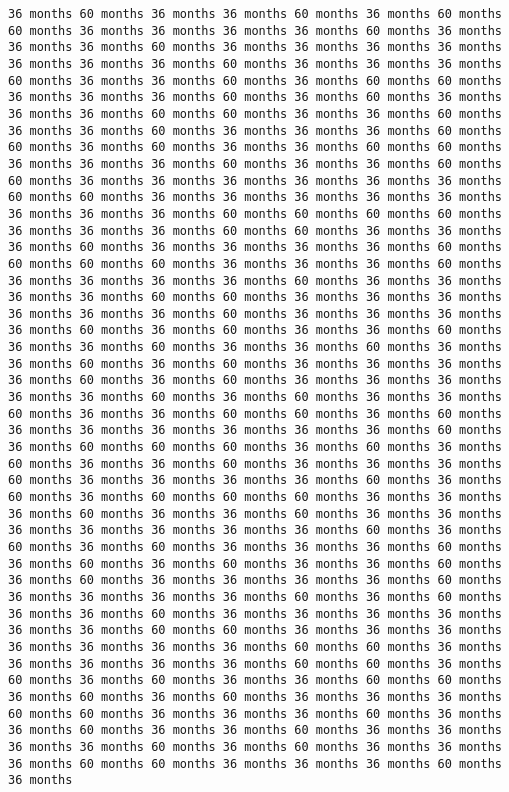 \documentclass[11pt]{article}
\begin{document}
\begin{Verbatim}[commandchars=\\\{\}, frame=single, framerule=2mm, rulecolor=\color{outerrorbackground}]
36 months 60 months 36 months 36 months 60 months 36 months 60 months 60 months 36 months 36 months 36 months 36 months 60 months 36 months 36 months 36 months 60 months 36 months 36 months 36 months 36 months 36 months 36 months 36 months 60 months 36 months 36 months 36 months 60 months 36 months 36 months 60 months 36 months 60 months 60 months 36 months 36 months 36 months 60 months 36 months 60 months 36 months 36 months 36 months 60 months 60 months 36 months 36 months 60 months 36 months 36 months 60 months 36 months 36 months 36 months 60 months 60 months 36 months 60 months 36 months 36 months 60 months 60 months 36 months 36 months 36 months 60 months 36 months 36 months 60 months 60 months 36 months 36 months 36 months 36 months 36 months 36 months 60 months 60 months 36 months 36 months 36 months 36 months 36 months 36 months 36 months 36 months 60 months 60 months 60 months 60 months 36 months 36 months 36 months 60 months 60 months 36 months 36 months 36 months 60 months 36 months 36 months 36 months 36 months 60 months 60 months 60 months 60 months 36 months 36 months 36 months 60 months 36 months 36 months 36 months 36 months 60 months 36 months 36 months 36 months 36 months 60 months 60 months 36 months 36 months 36 months 36 months 36 months 36 months 60 months 36 months 36 months 36 months 36 months 60 months 36 months 60 months 36 months 36 months 60 months 36 months 36 months 60 months 36 months 36 months 60 months 36 months 36 months 60 months 36 months 60 months 36 months 36 months 36 months 36 months 60 months 36 months 60 months 36 months 36 months 36 months 36 months 36 months 60 months 36 months 60 months 36 months 36 months 60 months 36 months 36 months 60 months 60 months 36 months 60 months 36 months 36 months 36 months 36 months 36 months 36 months 60 months 36 months 60 months 60 months 60 months 36 months 60 months 36 months 60 months 36 months 36 months 60 months 36 months 36 months 36 months 60 months 36 months 36 months 36 months 36 months 60 months 36 months 60 months 36 months 60 months 60 months 60 months 36 months 36 months 36 months 60 months 36 months 36 months 60 months 36 months 36 months 36 months 36 months 36 months 36 months 36 months 60 months 36 months 60 months 36 months 60 months 36 months 36 months 36 months 60 months 36 months 60 months 36 months 60 months 36 months 36 months 60 months 36 months 60 months 36 months 36 months 36 months 36 months 60 months 36 months 36 months 36 months 36 months 60 months 36 months 60 months 36 months 36 months 60 months 36 months 36 months 36 months 36 months 36 months 36 months 60 months 60 months 36 months 36 months 36 months 36 months 36 months 36 months 36 months 60 months 60 months 36 months 36 months 36 months 36 months 36 months 60 months 60 months 36 months 60 months 36 months 60 months 36 months 36 months 60 months 60 months 36 months 60 months 36 months 60 months 36 months 36 months 36 months 60 months 60 months 36 months 36 months 36 months 60 months 36 months 36 months 60 months 36 months 36 months 60 months 36 months 36 months 36 months 36 months 60 months 36 months 60 months 36 months 36 months 36 months 60 months 60 months 36 months 36 months 36 months 60 months 36 months 
\end{Verbatim}
\end{document}
